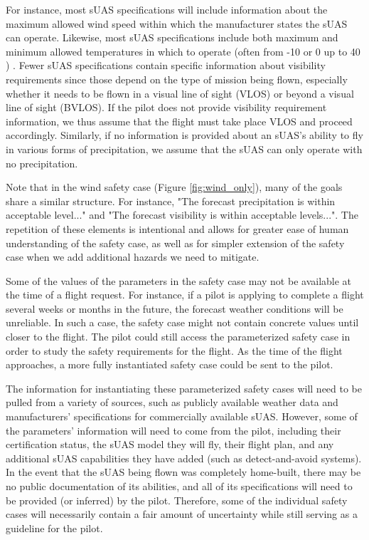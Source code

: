 For instance, most sUAS specifications will include information about the maximum allowed wind speed within which the manufacturer states the sUAS can operate. Likewise, most sUAS specifications include both maximum and minimum allowed temperatures in which to operate (often from -10 \textcelsius \;or 0 \textcelsius \;up to 40 \textcelsius) \cite{DEERCD20, DJI_MiniPro_4_Specs}. Fewer sUAS specifications contain specific information about visibility requirements since those depend on the type of mission being flown, especially whether it needs to be flown in a visual line of sight (VLOS) or beyond a visual line of sight (BVLOS). If the pilot does not provide visibility requirement information, we thus assume that the flight must take place VLOS and proceed accordingly. Similarly, if no information is provided about an sUAS's ability to fly in various forms of precipitation, we assume that the sUAS can only operate with no precipitation. 

Note that in the wind safety case (Figure \ref{fig:wind_only}), many of the goals share a similar structure. For instance, "The forecast precipitation is within acceptable level..." and "The forecast visibility is within acceptable levels...". The repetition of these elements is intentional and allows for greater ease of human understanding of the safety case, as well as for simpler extension of the safety case when we add additional hazards we need to mitigate. 

Some of the values of the parameters in the safety case may not be available at the time of a flight request. For instance, if a pilot is applying to complete a flight several weeks or months in the future, the forecast weather conditions will be unreliable. In such a case, the safety case might not contain concrete values until closer to the flight. The pilot could still access the parameterized safety case in order to study the safety requirements for the flight. As the time of the flight approaches, a more fully instantiated safety case could be sent to the pilot. 

The information for instantiating these parameterized safety cases will need to be pulled from a variety of sources, such as publicly available weather data and manufacturers' specifications for commercially available sUAS. However, some of the parameters' information will need to come from the pilot, including their certification status, the sUAS model they will fly, their flight plan, and any additional sUAS capabilities they have added (such as detect-and-avoid systems). 
In the event that the sUAS being flown was completely home-built, there may be no public documentation of its abilities, and all of its specifications will need to be provided (or inferred) by the pilot. 
Therefore, some of the individual safety cases will necessarily contain a fair amount of uncertainty while still serving as a guideline for the pilot. 


